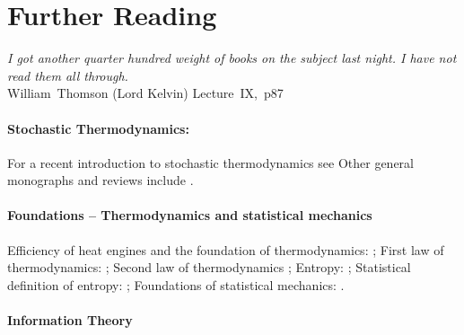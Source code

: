 \documentclass[Lectures.tex]{subfiles}
\begin{document}
\section{Further Reading}

\emph{I got another quarter hundred weight of books on the subject 
last night.  I have not read them all through.} \\
\hspace*{\fill} William~Thomson (Lord Kelvin) Lecture~IX,~p87




\paragraph{Stochastic Thermodynamics:}
For a recent introduction to stochastic thermodynamics see  Other general monographs and reviews include .

\paragraph{Foundations -- Thermodynamics and statistical mechanics} Efficiency of heat engines and the foundation of thermodynamics: ; First law of thermodynamics: ; Second law of thermodynamics  ; Entropy: ; Statistical definition of entropy: ; 
Foundations of statistical mechanics: .



\paragraph{Information Theory}




\end{document}
